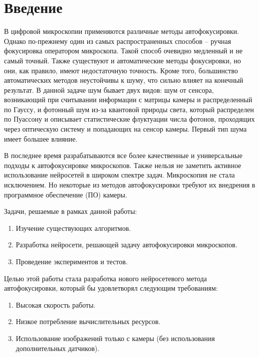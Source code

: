 \chapter*{Введение} %

В цифровой микроскопии применяются различные методы автофокусировки. Однако по-прежнему один из самых распространенных способов -- ручная фокусировка оператором микроскопа. Такой способ очевидно медленный и не самый точный. Также существуют и автоматические методы фокусировки, но они, как правило, имеют недостаточную точность. Кроме того, большинство автоматических методов неустойчивы к шуму, что сильно влияет на конечный результат. В данной задаче шум бывает двух видов: шум от сенсора, возникающий при считывании информации с матрицы камеры и распределенный по Гауссу, и фотонный шум из-за квантовой природы света, который распределен по Пуассону и описывает статистические флуктуации числа фотонов, проходящих через оптическую систему и попадающих на сенсор камеры. Первый тип шума имеет большее влияние.

В последнее время разрабатываются все более качественные и универсальные подходы к автофокусировке микроскопов. Также нельзя не заметить активное использование нейросетей в широком спектре задач. Микроскопия не стала исключением. Но некоторые из методов автофокусировки требуют их внедрения в программное обеспечение (ПО) камеры.

Задачи, решаемые в рамках данной работы:
\begin{enumerate}
	\item Изучение существующих алгоритмов.
	\item Разработка нейросети, решающей задачу автофокусировки микроскопов.
	\item Проведение экспериментов и тестов.
\end{enumerate} 

Целью этой работы стала разработка нового нейросетевого метода автофокусировки, который бы удовлетворял следующим требованиям:
\begin{enumerate}[1.]
	\item Высокая скорость работы.
	\item Низкое потребление вычислительных ресурсов.
	\item Использование изображений только с камеры (без использования дополнительных датчиков).
\end{enumerate}


